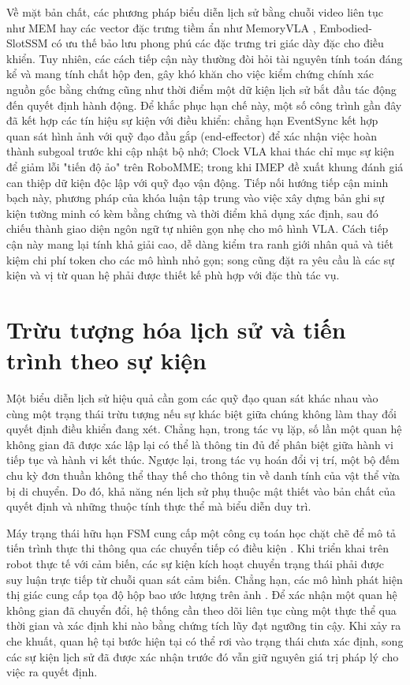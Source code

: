 Về mặt bản chất, các phương pháp biểu diễn lịch sử bằng chuỗi video liên tục như MEM \cite{mem2026} hay các vector đặc trưng tiềm ẩn như MemoryVLA \cite{memoryvla2026}, Embodied-SlotSSM \cite{liberomem2025} có ưu thế bảo lưu phong phú các đặc trưng tri giác dày đặc cho điều khiển. Tuy nhiên, các cách tiếp cận này thường đòi hỏi tài nguyên tính toán đáng kể và mang tính chất hộp đen, gây khó khăn cho việc kiểm chứng chính xác nguồn gốc bằng chứng cũng như thời điểm một dữ kiện lịch sử bắt đầu tác động đến quyết định hành động. Để khắc phục hạn chế này, một số công trình gần đây đã kết hợp các tín hiệu sự kiện với điều khiển: chẳng hạn EventSync \cite{eventsync2026} kết hợp quan sát hình ảnh với quỹ đạo đầu gắp (end-effector) để xác nhận việc hoàn thành subgoal trước khi cập nhật bộ nhớ; Clock VLA \cite{clockvla2026} khai thác chỉ mục sự kiện để giảm lỗi "tiến độ ảo" trên RoboMME; trong khi IMEP \cite{imep2026} đề xuất khung đánh giá can thiệp dữ kiện độc lập với quỹ đạo vận động. Tiếp nối hướng tiếp cận minh bạch này, phương pháp của khóa luận tập trung vào việc xây dựng bản ghi sự kiện tường minh có kèm bằng chứng và thời điểm khả dụng xác định, sau đó chiếu thành giao diện ngôn ngữ tự nhiên gọn nhẹ cho mô hình VLA. Cách tiếp cận này mang lại tính khả giải cao, dễ dàng kiểm tra ranh giới nhân quả và tiết kiệm chi phí token cho các mô hình nhỏ gọn; song cũng đặt ra yêu cầu là các sự kiện và vị từ quan hệ phải được thiết kế phù hợp với đặc thù tác vụ.

\section{Trừu tượng hóa lịch sử và tiến trình theo sự kiện}

Một biểu diễn lịch sử hiệu quả cần gom các quỹ đạo quan sát khác nhau vào cùng một trạng thái trừu tượng nếu sự khác biệt giữa chúng không làm thay đổi quyết định điều khiển đang xét. Chẳng hạn, trong tác vụ lặp, số lần một quan hệ không gian đã được xác lập lại có thể là thông tin đủ để phân biệt giữa hành vi tiếp tục và hành vi kết thúc. Ngược lại, trong tác vụ hoán đổi vị trí, một bộ đếm chu kỳ đơn thuần không thể thay thế cho thông tin về danh tính của vật thể vừa bị di chuyển. Do đó, khả năng nén lịch sử phụ thuộc mật thiết vào bản chất của quyết định và những thuộc tính thực thể mà biểu diễn duy trì.

Máy trạng thái hữu hạn FSM cung cấp một công cụ toán học chặt chẽ để mô tả tiến trình thực thi thông qua các chuyển tiếp có điều kiện \cite{rewardmachines2018}. Khi triển khai trên robot thực tế với cảm biến, các sự kiện kích hoạt chuyển trạng thái phải được suy luận trực tiếp từ chuỗi quan sát cảm biến. Chẳng hạn, các mô hình phát hiện thị giác cung cấp tọa độ hộp bao ước lượng trên ảnh \cite{groundingdino2024}. Để xác nhận một quan hệ không gian đã chuyển đổi, hệ thống cần theo dõi liên tục cùng một thực thể qua thời gian và xác định khi nào bằng chứng tích lũy đạt ngưỡng tin cậy. Khi xảy ra che khuất, quan hệ tại bước hiện tại có thể rơi vào trạng thái chưa xác định, song các sự kiện lịch sử đã được xác nhận trước đó vẫn giữ nguyên giá trị pháp lý cho việc ra quyết định.

